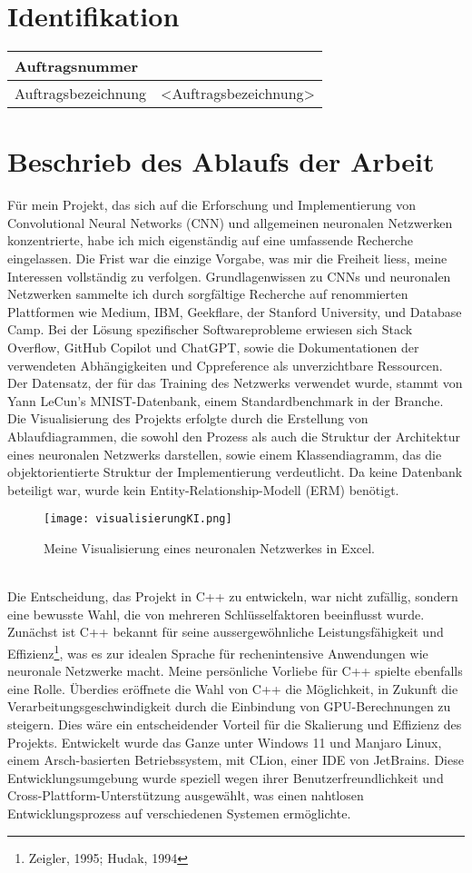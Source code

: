 \section{Identifikation}
\begin{xltabular}{\linewidth}{|l|l|}
	\hline
	Auftragsnummer & 
	\\\hline
	Auftragsbezeichnung & <Auftragsbezeichnung>
	\\\hline
\end{xltabular}
\label{tab:IdentifikationTable}

\section{Beschrieb des Ablaufs der Arbeit}
Für mein Projekt, das sich auf die Erforschung und Implementierung von Convolutional Neural Networks (CNN) und allgemeinen neuronalen Netzwerken konzentrierte, habe ich mich eigenständig auf eine umfassende Recherche eingelassen. Die Frist war die einzige Vorgabe, was mir die Freiheit liess, meine Interessen vollständig zu verfolgen. Grundlagenwissen zu CNNs und neuronalen Netzwerken sammelte ich durch sorgfältige Recherche auf renommierten Plattformen wie Medium, IBM, Geekflare, der Stanford University, und Database Camp. Bei der Lösung spezifischer Softwareprobleme erwiesen sich Stack Overflow, GitHub Copilot und ChatGPT, sowie die Dokumentationen der verwendeten Abhängigkeiten und Cppreference als unverzichtbare Ressourcen. Der Datensatz, der für das Training des Netzwerks verwendet wurde, stammt von Yann LeCun’s MNIST-Datenbank, einem Standardbenchmark in der Branche.
\\
Die Visualisierung des Projekts erfolgte durch die Erstellung von Ablaufdiagrammen, die sowohl den Prozess als auch die Struktur der Architektur eines neuronalen Netzwerks darstellen, sowie einem Klassendiagramm, das die objektorientierte Struktur der Implementierung verdeutlicht. Da keine Datenbank beteiligt war, wurde kein Entity-Relationship-Modell (ERM) benötigt.
\begin{figure}[H]
	\centering
		\texttt{[image: visualisierungKI.png]}
		\caption{Meine Visualisierung eines neuronalen Netzwerkes in Excel.}
	\label{fig:visualisierungKI}
\end{figure}
\\
Die Entscheidung, das Projekt in C++ zu entwickeln, war nicht zufällig, sondern eine bewusste Wahl, die von mehreren Schlüsselfaktoren beeinflusst wurde. Zunächst ist C++ bekannt für seine aussergewöhnliche Leistungsfähigkeit und Effizienz\footnote{Zeigler, 1995; Hudak, 1994}, was es zur idealen Sprache für rechenintensive Anwendungen wie neuronale Netzwerke macht. Meine persönliche Vorliebe für C++ spielte ebenfalls eine Rolle. Überdies eröffnete die Wahl von C++ die Möglichkeit, in Zukunft die Verarbeitungsgeschwindigkeit durch die Einbindung von GPU-Berechnungen zu steigern. Dies wäre ein entscheidender Vorteil für die Skalierung und Effizienz des Projekts. Entwickelt wurde das Ganze unter Windows 11 und Manjaro Linux, einem Arsch-basierten Betriebssystem, mit CLion, einer IDE von JetBrains. Diese Entwicklungsumgebung wurde speziell wegen ihrer Benutzerfreundlichkeit und Cross-Plattform-Unterstützung ausgewählt, was einen nahtlosen Entwicklungsprozess auf verschiedenen Systemen ermöglichte. 

